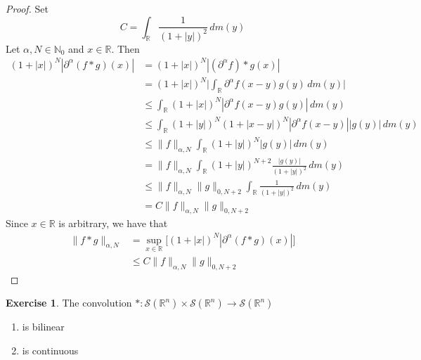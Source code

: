 \documentclass[12pt]{amsart}
\theoremstyle{definition}
\newtheorem{ex}[definition]{Exercise}
\newcommand{\p}{\partial}
\newcommand{\al}{\alpha}
\newcommand{\N}{\mathbb{N}}
\newcommand{\R}{\mathbb{R}}
\newcommand{\MS}{\mathcal{S}}
\newcommand{\dm}{\, d m}
\begin{document}
	\begin{proof}
		Set 
		$$C = \int_{\R} \frac{1}{(1+|y|)^2} \dm(y)$$
		Let $\al,N \in \N_0$ and $x \in \R$. Then 
		\begin{align*}
			(1+|x|)^N |\p^{\al} (f*g)(x)|
			& =   (1+|x|)^N |(\p^{\al}f )*g(x)| \\
			& =   (1+|x|)^N \bigg| \int_{\R}\p^{\al}f(x-y) g(y) \dm(y) \bigg|\\
			& \leq   \int_{\R}(1+|x|)^N|\p^{\al}f(x-y) g(y)| \dm(y) \\
			& \leq   \int_{\R}(1+|y|)^N(1+|x-y|)^N|\p^{\al}f(x-y)| |g(y)| \dm(y) \\
			& \leq  \|f\|_{\al, N} \int_{\R}(1+|y|)^N |g(y)| \dm(y) \\
			& =  \|f\|_{\al, N} \int_{\R}(1+|y|)^{N+2} \frac{|g(y)|}{(1+|y|)^2} \dm(y) \\
			& \leq \|f\|_{\al, N} \|g\|_{0, N+2} \int_{\R} \frac{1}{(1+|y|)^2} \dm(y) \\
			& =  C\|f\|_{\al, N} \|g\|_{0, N+2}
		\end{align*}
		Since $x \in \R$ is arbitrary, we have that 
		\begin{align*}
			\|f*g\|_{\al, N}
			& = \sup_{x \in \R} \bigg[ (1+|x|)^N |\p^{\al} (f*g)(x)| \bigg] \\
			& \leq C\|f\|_{\al, N} \|g\|_{0, N+2}
		\end{align*}
	\end{proof}

	\begin{ex}
		The convolution $*: \MS(\R^n) \times \MS(\R^n) \rightarrow \MS(\R^n)$ 
		\begin{enumerate}
			\item is bilinear
			\item is continuous
		\end{enumerate}
	\end{ex}
\end{document}
